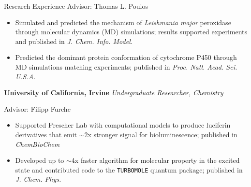 \begin{rubric}{Research Experience}
  Advisor: Thomas L. Poulos
  \vspace{-0.5em}
  \begin{itemize}
  \itemsep-0.5em
  \item Simulated and predicted the mechanism of \textit{Leishmania major} peroxidase through
    molecular dynamics (MD) simulations; results supported experiments and published in
    \textit{J. Chem. Info. Model.}
  \item Predicted the dominant protein conformation of cytochrome P450 through
    MD simulations matching experiments; published in \textit{Proc. Natl. Acad. Sci. U.S.A.}
  \end{itemize}
  \textbf{University of California, Irvine}
  \textit{Undergraduate Researcher, Chemistry}

  Advisor: Filipp Furche
  \vspace{-0.5em}
  \begin{itemize}
  \itemsep-0.5em
  \item Supported Prescher Lab with computational models to produce luciferin derivatives that emit
    $\sim$2x stronger signal for bioluminescence; published in \textit{ChemBioChem}
  \item Developed up to $\sim$4x faster algorithm for molecular property in the excited
    state and contributed code to the \texttt{TURBOMOLE} quantum package; published in
    \textit{J. Chem. Phys.}
  \end{itemize}
\end{rubric}
